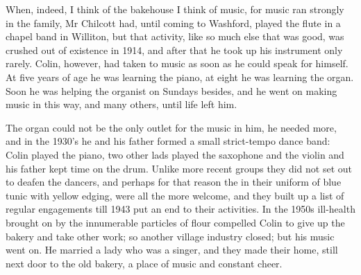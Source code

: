 When, indeed, I think of the bakehouse I think of music, for music ran strongly in the family, Mr Chilcott had, until coming to Washford, played the flute in a chapel band in Williton, but that activity, like so much else that was good, was crushed out of existence in 1914, and after that he took up his instrument only rarely. Colin, however, had taken to music as soon as he could speak for himself. At five years of age he was learning the piano, at eight he was learning the organ. Soon he was helping the organist on Sundays besides, and he went on making music in this way, and many others, until life left him.

The organ could not be the only outlet for the music in him, he needed more, and in the 1930’s he and his father formed a small strict-tempo dance band: Colin played the piano, two other lads played the saxophone and the violin and his father kept time on the drum. Unlike more recent groups they did not set out to deafen the dancers, and perhaps for that reason the  in their uniform of blue tunic with yellow edging, were all the more welcome, and they built up a list of regular engagements till 1943 put an end to their activities. In the 1950s ill-health brought on by the innumerable particles of flour compelled Colin to give up the bakery and take other work; so another village industry closed; but his music went on. He married a lady who was a singer, and they made their home, still next door to the old bakery, a place of music and constant cheer.
